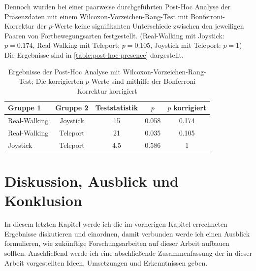                     Dennoch wurden bei einer paarweise durchgeführten Post-Hoc Analyse der Präsenzdaten mit einem
                    Wilcoxon-Vorzeichen-Rang-Test mit Bonferroni-Korrektur der $p$-Werte keine signifikanten Unterschiede zwischen den jeweiligen Paaren von Fortbewegungsarten festgestellt. (Real-Walking mit Joystick: $p = 0.174$, Real-Walking mit Teleport: $p = 0.105$, Joystick mit Teleport: $p = 1$) Die Ergebnisse sind in \autoref{table:post-hoc-presence} dargestellt.

\begin{table}[!ht]
    \renewcommand\arraystretch{1.2}
    \centering
    \begin{tabular}{lcccc} \toprule
Gruppe 1     & Gruppe 2 & Teststatistik &  $p$  & $p$ korrigiert \\ \midrule
Real-Walking & Joystick & 15            & 0.058 & 0.174        \\
Real-Walking & Teleport & 21            & 0.035 & 0.105        \\
Joystick     & Teleport & 4.5           & 0.586 & 1     \\ \bottomrule
    \end{tabular}
    \caption{Ergebnisse der Post-Hoc Analyse mit Wilcoxon-Vorzeichen-Rang-Test; Die korrigierten $p$-Werte sind mithilfe der Bonferroni Korrektur korrigiert}\label{table:post-hoc-presence}
\end{table}



\chapter{Diskussion, Ausblick und Konklusion}\label{chapter:discussion-conclusion}
    In diesem letzten Kapitel werde ich die im vorherigen Kapitel errechneten Ergebnisse diskutieren und einordnen, damit verbunden werde ich einen Ausblick formulieren, wie zukünftige Forschungsarbeiten auf dieser Arbeit aufbauen sollten. Anschließend werde ich eine abschließende Zusammenfassung der in dieser Arbeit vorgestellten Ideen, Umsetzungen und Erkenntnissen geben.

